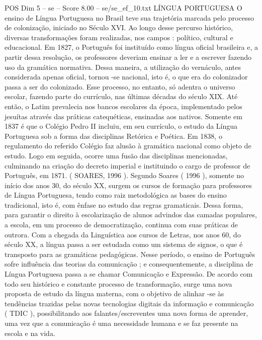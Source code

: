 \begin{textsample}{POS Dim 5 – se – Score 8.00 – se/se\_ef\_10.txt}  \label{ex:f5_pos_132}
LÍNGUA PORTUGUESA O ensino de Língua Portuguesa no Brasil teve sua trajetória marcada pelo processo de colonização, iniciado no Século XVI.
Ao longo desse percurso histórico, diversas transformações foram realizadas, nos campos : político, cultural e educacional.
Em 1827, o Português foi instituído como língua oficial brasileira e, a partir dessa resolução, os professores deveriam ensinar a ler e a escrever fazendo uso da gramática normativa.
Dessa maneira, a utilização do vernáculo, antes considerada apenas oficial, tornou -se nacional, isto é, o que era do colonizador passa a ser do colonizado.
Esse processo, no entanto, só adentra o universo escolar, fazendo parte do currículo, nas últimas décadas do século XIX.
Até então, o Latim prevalecia nos bancos escolares da época, implementado pelos jesuítas através das práticas catequéticas, ensinadas aos nativos.
Somente em 1837 é que o Colégio Pedro II incluiu, em seu currículo, o estudo da Língua Portuguesa sob a forma das disciplinas Retórica e Poética.
Em 1838, o regulamento do referido Colégio faz alusão à gramática nacional como objeto de estudo.
Logo em seguida, ocorre uma fusão das disciplinas mencionadas, culminando na criação do decreto imperial e instituindo o cargo de professor de Português, em 1871. ( SOARES, 1996 ).
Segundo Soares ( 1996 ), somente no início dos anos 30, do século XX, surgem os cursos de formação para professores de Língua Portuguesa, tendo como raiz metodológica as bases do ensino tradicional, isto é, com ênfase no estudo das regras gramaticais.
Dessa forma, para garantir o direito à escolarização de alunos advindos das camadas populares, a escola, em um processo de democratização, continua com suas práticas de outrora.
Com a chegada da Linguística aos cursos de Letras, nos anos 60, do século XX, a língua passa a ser estudada como um sistema de signos, o que é transposto para as gramáticas pedagógicas.
Nesse período, o ensino de Português sofre influência das teorias da comunicação ; e consequentemente, a disciplina de Língua Portuguesa passa a se chamar Comunicação e Expressão.
De acordo com todo seu histórico e constante processo de transformação, surge uma nova proposta de estudo da língua materna, com o objetivo de alinhar -se às tendências trazidas pelas novas tecnologias digitais da informação e comunicação ( TDIC ), possibilitando aos falantes/escreventes uma nova forma de aprender, uma vez que a comunicação é uma necessidade humana e se faz presente na escola e na vida.

\end{textsample}

